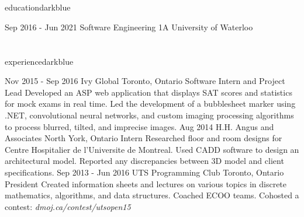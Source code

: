 \documentclass{resume}
\begin{document}
	\begin{main}
		\vspace{5pt}%
		\section{\faBook}{education}{darkblue}
			\begin{entrylist}
				\rightentry%
				{Sep 2016 - Jun 2021}%
				{Software Engineering 1A}%
				{University of Waterloo}%
				{}{}
			\end{entrylist}
		\vspace{-10pt}%
		\section{\faBriefcase}{experience}{darkblue}
			\begin{entrylist}
				\rightentry%
					{Nov 2015 - Sep 2016}%
					{Ivy Global}%
					{Toronto, Ontario}%
					{Software Intern and Project Lead}%
					{Developed an ASP web application that displays SAT scores and statistics for mock exams in real time. Led the development of a bubblesheet marker using .NET, convolutional neural networks, and custom imaging processing algorithms to process blurred, tilted, and imprecise images.}
				\rightentry%
					{Aug 2014}%
					{H.H. Angus and Associates}%
					{North York, Ontario}%
					{Intern}%
					{Researched floor and room designs for Centre Hospitalier de l'Universite de Montreal. Used CADD software to design an architectural model. Reported any discrepancies between 3D model and client specifications.}
				\rightentry%
					{Sep 2013 - Jun 2016}%
					{UTS Programming Club}%
					{Toronto, Ontario}%
					{President}%
					{Created information sheets and lectures on various topics in discrete mathematics, algorithms, and data structures. Coached ECOO teams. Cohosted a contest: \emph{dmoj.ca/contest/utsopen15}}
			\end{entrylist}

\end{main}
\end{document}
